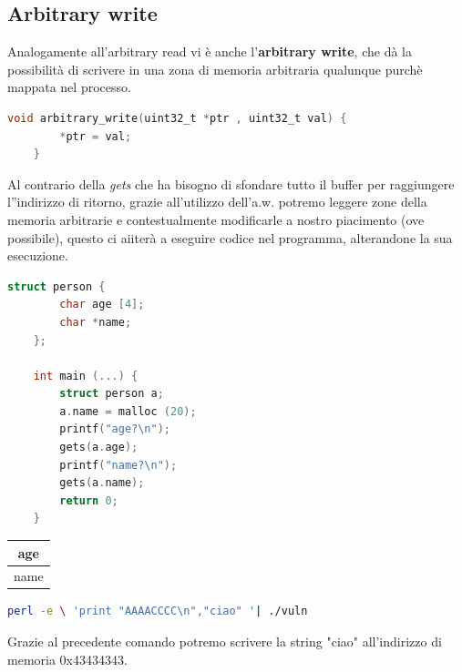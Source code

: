 \subsection{Arbitrary write}
Analogamente all'arbitrary read vi è anche l'\textbf{arbitrary write}, che dà la possibilità di scrivere in una zona di memoria arbitraria qualunque purchè mappata nel processo.
\begin{lstlisting}[language=C]
    void arbitrary_write(uint32_t *ptr , uint32_t val) {
        *ptr = val;
    }
\end{lstlisting}
Al contrario della \textit{gets} che ha bisogno di sfondare tutto il buffer per raggiungere l''indirizzo di ritorno, grazie all'utilizzo dell'a.w. potremo leggere zone della memoria arbitrarie e contestualmente modificarle a nostro piacimento (ove possibile), questo ci aiiterà a eseguire codice nel programma, alterandone la sua esecuzione.

\begin{lstlisting}[language=C]
    struct person {
        char age [4];
        char *name;
    };

    int main (...) {
        struct person a;
        a.name = malloc (20);
        printf("age?\n");
        gets(a.age);
        printf("name?\n");
        gets(a.name);
        return 0;
    }
\end{lstlisting}

\begin{center}
    \begin{table}[h!]
        \centering
        \begin{tabular}{|c|}
            \hline
            age \\
            \hline
            name \\
            \hline
        \end{tabular}
    \end{table}
\end{center}

\begin{lstlisting}[language=bash]
    perl -e \ 'print "AAAACCCC\n","ciao" '| ./vuln
\end{lstlisting}
Grazie al precedente comando potremo scrivere la string "ciao" all'indirizzo di memoria 0x43434343.

